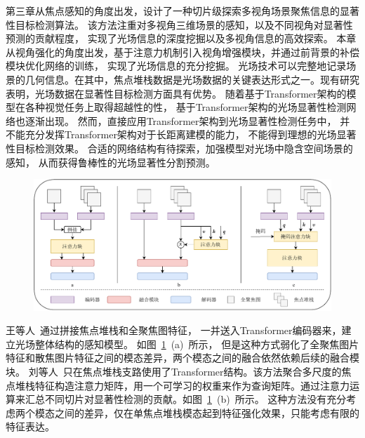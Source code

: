\label{chap:part4}
%
%
%
%
第三章从焦点感知的角度出发，设计了一种切片级探索多视角场景聚焦信息的显著性目标检测算法。
该方法注重对多视角三维场景的感知，以及不同视角对显著性预测的贡献程度，
实现了光场信息的深度挖掘以及多视角信息的高效探索。
%
%
本章从视角强化的角度出发，基于注意力机制引入视角增强模块，并通过前背景的补偿模块优化网络的训练，
实现了光场信息的充分挖掘。
%
%
%
%
%
%
%
%
光场技术可以完整地记录场景的几何信息。在其中，焦点堆栈数据是光场数据的关键表达形式之一。现有研究表明，光场数据在显著性目标检测方面具有优势。
随着基于Transformer架构的模型在各种视觉任务上取得超越性的性，
基于Transformer架构的光场显著性检测网络也逐渐出现\cite{wang2023tenet,liu2023lftransnet}。
然而，直接应用Transformer架构到光场显著性检测任务中，
并不能充分发挥Transformer架构对于长距离建模的能力，
不能得到理想的光场显著性目标检测效果。
合适的网络结构有待探索，加强模型对光场中隐含空间场景的感知，
从而获得鲁棒性的光场显著性分割预测。
%
%
%
%
\par
\begin{figure}[!ht]
	\centering
	\includegraphics[width=0.95\linewidth]{figures/chapter4/task2_ins.drawio}
	\label{cpt4_fig1:task2_ins}
\end{figure}
%
%
%
%
王等人~\cite{wang2023tenet}通过拼接焦点堆栈和全聚焦图特征，
一并送入Transformer编码器来，建立光场整体结构的感知模型。
如图~\ref{cpt4_fig1:task2_ins}~(a)~所示，
但是这种方式弱化了全聚焦图片特征和散焦图片特征之间的模态差异，两个模态之间的融合依然依赖后续的融合模块。
刘等人~\cite{liu2023lftransnet}只在焦点堆栈支路使用了Transformer结构。该方法聚合多尺度的焦点堆栈特征构造注意力矩阵，用一个可学习的权重来作为查询矩阵。通过注意力运算来汇总不同切片对显著性检测的贡献。如图~\ref{cpt4_fig1:task2_ins}~(b)~所示。
%
%
这种方法没有充分考虑两个模态之间的差异，仅在单焦点堆栈模态起到特征强化效果，只能考虑有限的特征表达。
